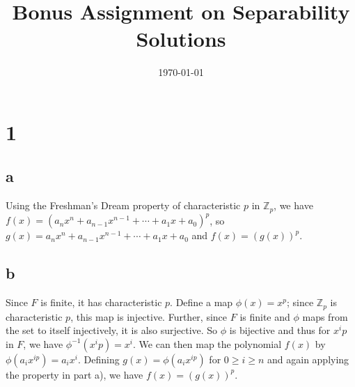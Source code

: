 \documentclass{article}
\title{\textbf{Bonus Assignment on Separability Solutions}}
\date{}
\date\today
\begin{document}
\maketitle %

\thispagestyle{firstpage}
\section*{1}

\subsection*{a}

Using the Freshman's Dream property of characteristic $p$ in $\mathbb{Z}_p$, we have 
$f(x) = (a_{n}x^{n} + a_{n-1}x^{n-1} + \cdots + a_1 x + a_0)^p$, so 
$g(x) = a_{n}x^{n} + a_{n-1}x^{n-1} + \cdots + a_1 x + a_0$ and $f(x) = (g(x))^p$.

\subsection*{b}

Since $F$ is finite, it has characteristic $p$.  
Define a map $\phi(x) = x^p$; since $\mathbb{Z}_p$ is 
characteristic $p$, this map is injective.  Further, since $F$ is finite and 
$\phi$ maps from the set to itself injectively, it is also surjective.  So 
$\phi$ is bijective and thus for $x^ip$ in $F$, we have $\phi^{-1}(x^ip) = x^i$.
We can then map the polynomial $f(x)$ by $\phi(a_ix^{ip}) = a_ix^i$.
Defining $g(x) = \phi(a_ix^{ip})$ for $0 \geq i \geq n$ and again applying the 
property in part a), we have $f(x) = (g(x))^p$.
\end{document}

